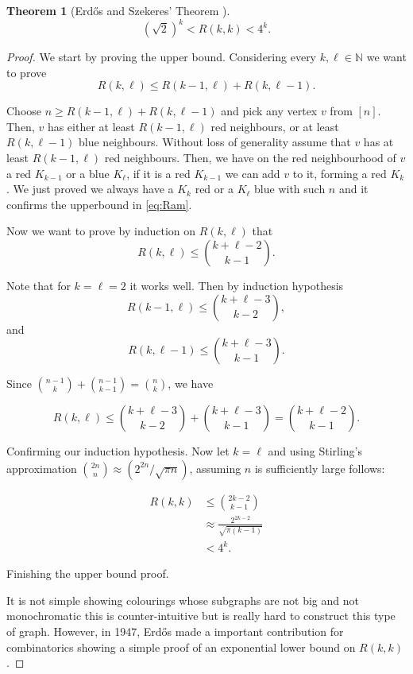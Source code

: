 \documentclass[12pt,twoside,a4paper,bibliography=totocnumbered]{book}
\numberwithin{equation}{section}
\newtheorem{theorem}             {Theorem}[section]
\theoremstyle{remark}
\begin{document}
\begin{theorem}[{Erd\H{o}s and Szekeres' Theorem \cite{ersz35, Er47}}]\label{thm:ErdosandS}
$$(\sqrt{2})^k < R(k,k) < 4^k.$$
\end{theorem}
\begin{proof} We start by proving the upper bound. Considering every $k, \ell \in \mathbb{N}$ we want to prove
\begin{equation}\label{eq:Ram}
R(k,\ell ) \leq R(k-1,\ell )+R(k,\ell-1).
\end{equation}

Choose $n \geq R(k-1,\ell) + R(k, \ell-1)$ and pick any vertex $v$ from $[n]$. Then, $v$ has either at least $R(k-1,\ell)$ red neighbours, or at least $R(k,\ell-1)$ blue neighbours. Without loss of generality assume that $v$ has at least $R(k-1,\ell)$ red neighbours. Then, we have on the red neighbourhood of $v$ a red $K_{k-1}$ or a blue $K_{\ell}$, if it is a red $K_{k-1}$ we can add $v$ to it, forming a red $K_k$. We just proved we always have a $K_k$ red or a $K_{\ell}$ blue with such $n$ and it confirms the upperbound in \ref{eq:Ram}.

Now we want to prove by induction on $R(k,\ell)$ that
$$R(k,\ell) \leq \binom{k+\ell - 2}{k - 1}.$$

Note that for $k = \ell = 2$ it works well. Then by induction hypothesis
$$R(k-1,\ell)\leq \binom{k+\ell -3}{k-2},$$ and $$R(k,\ell-1)\leq \binom{k+\ell-3}{k-1}.$$

Since $\binom{n-1}{k} + \binom{n-1}{k-1} = \binom{n}{k}$, we have

$$R(k,\ell)\leq \binom{k+\ell-3}{k-2} + \binom{k+\ell-3}{k-1} = \binom{k+ \ell -2}{k-1}.$$

Confirming our induction hypothesis. Now let $k = \ell$ and using Stirling's approximation  $\binom{2n}{n} \approx (2^{2n}/\sqrt{\pi n})$, assuming $n$ is sufficiently large follows:

\begin{align*}
R(k,k) &\leq \binom{2k -2}{k-1}\\
& \approx \frac{2^{2k-2}}{\sqrt{\pi (k-1)}}\\
& < 4^k.
\end{align*}

Finishing the upper bound proof.

It is not simple showing colourings whose subgraphs are not big and not monochromatic this is counter-intuitive but is really hard to construct this type of graph. However, in 1947, Erd\H{o}s made a important contribution for combinatorics showing a simple proof of an exponential lower bound on $R(k,k)$.


\end{proof}
\end{document}
